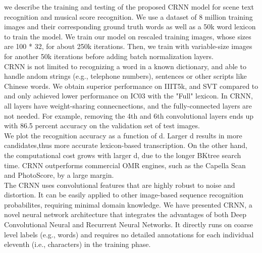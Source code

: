 \documentclass{article}
\begin{document}
we describe the training and testing of the proposed CRNN model for scene text recognition and musical score recognition. We use a dataset of 8 million training images and their corresponding ground truth words as well as a 50k word lexicon to train the model. We train our model on rescaled training images, whose sizes are 100 * 32, for about 250k iterations. Then, we train with variable-size images for another 50k iterations before adding batch normalization layers.\\

CRNN is not limited to recognizing a word in a known dictionary, and able to handle andom strings (e.g., telephone numbers), sentences or other scripts like Chinese words. We obtain superior performance on IIIT5k, and SVT compared to  and only achieved lower performance on IC03 with the "Full" lexicon. In CRNN, all layers have weight-sharing connec­nections, and the fully-connected layers are not needed. For example, removing the 4th and 6th convolutional layers ends up with 86.5 percent accuracy on the validation set of test images.\\

We plot the recognition accuracy as a function of d. Larger d results in more candidates,thus more accurate lexicon-based transcription. On the other hand, the computational cost grows with larger d, due to the longer BKtree search time. CRNN outperforms commercial OMR engines, such as the Capella Scan and PhotoScore, by a large margin.\\

The CRNN uses convolutional features that are highly robust to noise and distortion. It can be easily applied to other image-based sequence recognition probabilites, requiring minimal domain knowledge.
We have presented CRNN, a novel neural network architecture that integrates the advantages of both Deep Convolutional Neural and Recurrent Neural Networks. It directly runs on coarse level labels (e.g., words) and requires no detailed annotations for each individual eleventh (i.e., characters) in the training phase.
\end{document}
